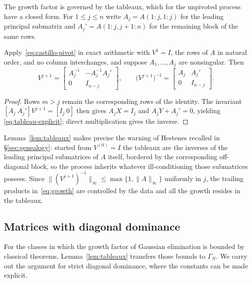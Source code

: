 \documentclass[review,onefignum,onetabnum]{siamart251216}
\begin{document}
The growth factor is governed by the tableaux, which for the unpivoted process have a closed
form. For $1\le j\le n$ write $A_j=A(1{:}j,1{:}j)$ for the leading principal submatrix and
$A_j'=A(1{:}j,j{+}1{:}n)$ for the remaining block of the same rows.

\begin{lemma}\label{lem:tableaux}
Apply~\eqref{eq:castillo-pivot} in exact arithmetic with $V^1=I$, the rows of $A$ in natural
order, and no column interchanges, and suppose $A_1,\dots,A_j$ are nonsingular. Then
%
\begin{equation}\label{eq:tableau-explicit}
V^{j+1}
=
\begin{bmatrix} A_j^{-1} & -A_j^{-1}A_j' \\[2pt] 0 & I_{n-j}\end{bmatrix},
\qquad
\bigl(V^{j+1}\bigr)^{-1}
=
\begin{bmatrix} A_j & A_j' \\[2pt] 0 & I_{n-j}\end{bmatrix}.
\end{equation}
\end{lemma}

\begin{proof}
Rows $m>j$ remain the corresponding rows of the identity.  The invariant
$[A_j\ A_j']V^{j+1}=[I_j\ 0]$ then gives $A_jX=I_j$ and $A_jY+A_j'=0$, yielding
\eqref{eq:tableau-explicit}; direct multiplication gives the inverse.
\end{proof}

Lemma~\ref{lem:tableaux} makes precise the warning of Hestenes recalled in
\S\ref{sec:genealogy}: started from $V^{(0)}=I$ the tableaux are the inverses of the leading
principal submatrices of $A$ itself, bordered by the corresponding off-diagonal block, so the
process inherits whatever ill-conditioning those submatrices possess. Since
$\|(V^{j+1})^{-1}\|_\infty\le\max\{1,\|A\|_\infty\}$ uniformly in $j$, the trailing products
in~\eqref{eq:growth} are controlled by the data and all the growth resides in the tableaux.

\subsection{Matrices with diagonal dominance}
\label{sec:dd}

For the classes in which the growth factor of Gaussian elimination is bounded by classical
theorems, Lemma~\ref{lem:tableaux} transfers those bounds to $\Gamma_N$. We carry out the
argument for strict diagonal dominance, where the constants can be made explicit.
\end{document}
